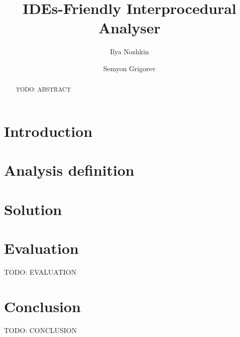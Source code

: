 \documentclass[sigconf]{acmart}
\begin{document}
\title[IDEs-Friendly Interprocedural Analyser]{IDEs-Friendly Interprocedural Analyser}

\author{Ilya Nozhkin}

\author{Semyon Grigorev}

\begin{abstract}
TODO: ABSTRACT
\end{abstract}


\begin{CCSXML}
\end{CCSXML}



\maketitle

\section{Introduction}


\section{Analysis definition}


\section{Solution}


\section{Evaluation}
TODO: EVALUATION

\section{Conclusion}
TODO: CONCLUSION


 
\end{document}
